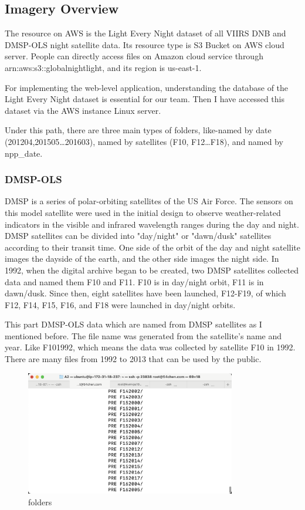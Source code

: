 \documentclass[conference]{IEEEtran}
\begin{document}
\subsection{Imagery Overview}
The resource on AWS is the Light Every Night dataset of all VIIRS DNB and DMSP-OLS night satellite data. Its resource type is S3 Bucket on AWS cloud server. People can directly access files on Amazon cloud service through arn:aws:s3::globalnightlight, and its region is us-east-1\cite{WorldBan13:online}.

For implementing the web-level application, understanding the database of the Light Every Night dataset is essential 
for our team. Then I have accessed this dataset via the AWS instance Linux server. 

Under this path, there are three main types of folders, like-named by date (201204,201505…201603), named by satellites 
(F10, F12…F18), and named by npp\_date.

\subsubsection{DMSP-OLS}

DMSP is a series of polar-orbiting satellites of the US Air Force. The sensors on this model satellite were used in the 
initial design to observe weather-related indicators in the visible and infrared wavelength ranges during the day and night. 
DMSP satellites can be divided into "day/night" or "dawn/dusk" satellites according to their transit time. One side of the 
orbit of the day and night satellite images the dayside of the earth, and the other side images the night side. In 1992, when 
the digital archive began to be created, two DMSP satellites collected data and named them F10 and F11. F10 is in day/night 
orbit, F11 is in dawn/dusk. Since then, eight satellites have been launched, F12-F19, of which F12, F14, F15, F16, and F18 
were launched in day/night orbits.

This part DMSP-OLS data which are named from DMSP satellites as I mentioned before. The file name was generated from the 
satellite's name and year. Like F101992, which means the data was collected by satellite F10 in 1992. There are many files 
from 1992 to 2013 that can be used by the public.

\begin{figure}[htbp]
    \centerline{\includegraphics[width=260pt]{images/2.png}}
    \caption{folders}
    \label{folders}
\end{figure}
\end{document}
